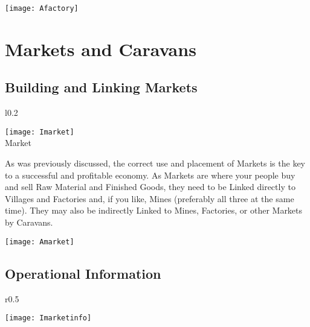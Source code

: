 \begin{center}
	\texttt{[image: Afactory]}
\end{center}

\section{Markets and Caravans}


\subsection{Building and Linking Markets}

\begin{wrapfigure}{l}{0.2\textwidth}
	\vspace{-20pt}
	\begin{center}
		\texttt{[image: Imarket]}
		\\ Market
	\end{center}
	\vspace{-20pt}
\end{wrapfigure}


As was previously discussed, the correct use and placement of Markets is the key to a successful and profitable economy. As Markets are where your people buy and sell Raw Material and Finished Goods, they need to be Linked directly to Villages and Factories and, if you like, Mines (preferably all three at the same time). They may also be indirectly Linked to Mines, Factories, or other Markets by Caravans.

\begin{center}
	\texttt{[image: Amarket]}
\end{center}

\subsection{Operational Information}

\begin{wrapfigure}{r}{0.5\textwidth}
	\vspace{-20pt}
	\begin{center}
		\texttt{[image: Imarketinfo]}
	\end{center}
	\vspace{-20pt}
\end{wrapfigure}

